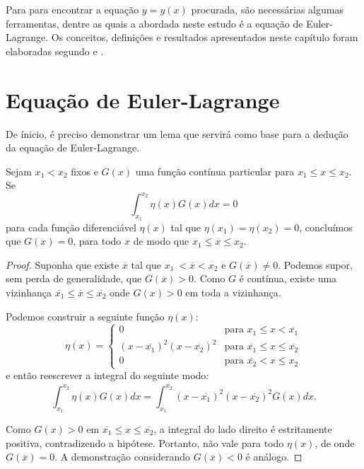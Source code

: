 Para para encontrar a equação $y=y(x)$ procurada, são necessárias algumas ferramentas, dentre as quais a abordada neste estudo é a equação de Euler-Lagrange. Os conceitos, definições e resultados apresentados neste capítulo foram elaboradas segundo  e .

\section{Equação de Euler-Lagrange}

De ínicio, é preciso demonstrar um lema que servirá como base para a dedução da equação de Euler-Lagrange.

\begin{lema}
\label{lema:cap_calcvar_lema_1}
Sejam $x_1 < x_2$ fixos e $G(x)$ uma função contínua particular para $x_1 \leqslant x \leqslant x_2$. Se $$\int_{x_1}^{x_2} \eta (x) G(x) dx = 0$$
para cada função diferenciável $\eta (x)$ tal que $\eta (x_1)=\eta (x_2)=0$, concluímos que $G(x)=0$, para todo $x$ de modo que $x_1 \leqslant x \leqslant x_2$.

\begin{proof}
Suponha que existe $\overline{x}$ tal que $x_1\ < \overline{x} < x_2$ e $G(\overline{x})\neq 0$. Podemos supor, sem perda de generalidade, que $G(\overline{x})>0$. Como $G$ é contínua, existe uma vizinhança $\overline{x_1} \leqslant \overline{x} \leqslant \overline{x_2}$ onde $G(x)>0$ em toda a vizinhança.

Podemos construir a seguinte função $\eta (x)$:
$$
\eta (x) = 
	\begin{cases}
		0 											& \mbox{para } x_1 \leqslant x < \overline{x_1}\\
		(x-\overline{x_1})^2(x-\overline{x_2})^2	& \mbox{para } \overline{x_1} \leqslant x \leqslant \overline{x_2}\\
		0											& \mbox{para } \overline{x_2} < x \leqslant x_2
	\end{cases}
$$
e então reescrever a integral do seguinte modo:
$$\int_{x_1}^{x_2}\eta (x) G(x)dx =\int_{\overline{x_1}}^{\overline{x_2}}(x-\overline{x_1})^2(x-\overline{x_2})^2G(x)dx\text{.}$$

Como $G(x) > 0$ em $\overline{x_1} \leqslant x \leqslant \overline{x_2}$, a integral do lado direito é estritamente positiva, contradizendo a hipótese. Portanto, não vale para todo $\eta (x)$, de onde $G(\overline{x})=0$. A demonstração considerando $G(\overline{x})<0$ é análogo.
\end{proof}
\end{lema}

